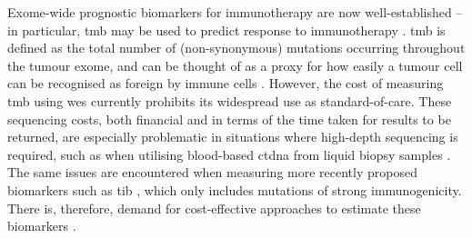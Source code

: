\documentclass[12pt]{article}
\begin{document}
Exome-wide prognostic biomarkers for immunotherapy are now well-established -- in particular, \acrfull{tmb} may be used to predict response to immunotherapy \citep{zhu_association_2019, cao_high_2019}.  \acrshort{tmb} is defined as the total number of (non-synonymous) mutations occurring throughout the tumour exome, and can be thought of as a proxy for how easily a tumour cell can be recognised as foreign by immune cells \citep{chan_development_2019}. However, the cost of measuring \acrshort{tmb} using \acrfull{wes} \citep{sboner_real_2011} currently prohibits its widespread use as standard-of-care. These sequencing costs, both financial and in terms of the time taken for results to be returned, are especially problematic in situations where high-depth sequencing is required, such as when utilising blood-based \acrfull{ctdna} from liquid biopsy samples \citep{gandara_blood-based_2018}. The same issues are encountered when measuring more recently proposed biomarkers such as \acrfull{tib} \citep{wu_tumor_2019,turajlic_insertion-and-deletion-derived_2017}, which only includes mutations of strong immunogenicity. There is, therefore, demand for cost-effective approaches to estimate these biomarkers \citep{fancello_tumor_2019, golkaram_interplay_2020}.
\end{document}
